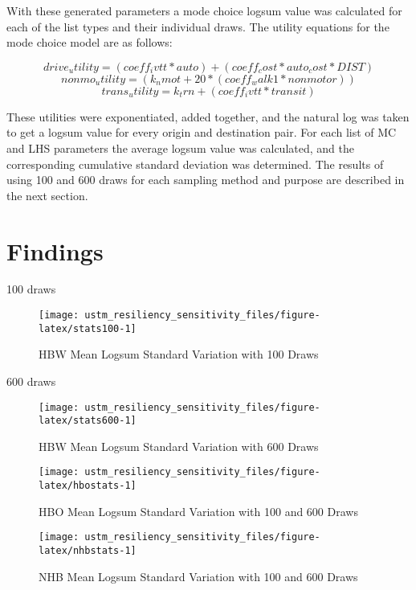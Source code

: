 \documentclass[3p, authoryear, review]{elsarticle} %
\begin{document}
With these generated parameters a mode choice logsum value was calculated for each of the list types and their individual draws. The utility equations for the mode choice model are as follows:

\begin{equation}
{drive_utility} = ({coeff_ivtt}*{auto})+({coeff_cost}*{auto_cost}*{DIST})
\label{eq:driveutil}
\end{equation}
\begin{equation}
{nonmo_utility} = ({k_nmot}+ 20 * ({coeff_walk1}*{nonmotor}))
\label{eq:nonmoutil}
\end{equation}
\begin{equation}
{trans_utility} = {k_trn} + ({coeff_ivtt}*{transit})
\label{eq:transutil}
\end{equation}

These utilities were exponentiated, added together, and the natural log was taken to get a logsum value for every origin and destination pair. For each list of MC and LHS parameters the average logsum value was calculated, and the corresponding cumulative standard deviation was determined. The results of using 100 and 600 draws for each sampling method and purpose are described in the next section.

\hypertarget{findings}{%
\section{Findings}\label{findings}}

100 draws

\begin{figure}

{\centering \texttt{[image: ustm\_resiliency\_sensitivity\_files/figure-latex/stats100-1]} 

}

\caption{HBW Mean Logsum Standard Variation with 100 Draws}\label{fig:stats100}
\end{figure}

600 draws

\begin{figure}

{\centering \texttt{[image: ustm\_resiliency\_sensitivity\_files/figure-latex/stats600-1]} 

}

\caption{HBW Mean Logsum Standard Variation with 600 Draws}\label{fig:stats600}
\end{figure}

\begin{figure}

{\centering \texttt{[image: ustm\_resiliency\_sensitivity\_files/figure-latex/hbostats-1]} 

}

\caption{HBO Mean Logsum Standard Variation with 100 and 600 Draws}\label{fig:hbostats}
\end{figure}

\begin{figure}

{\centering \texttt{[image: ustm\_resiliency\_sensitivity\_files/figure-latex/nhbstats-1]} 

}

\caption{NHB Mean Logsum Standard Variation with 100 and 600 Draws}\label{fig:nhbstats}
\end{figure}


\end{document}
